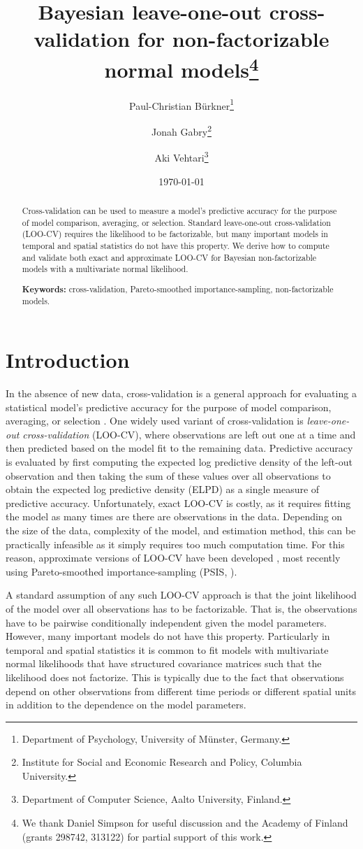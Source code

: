 \documentclass[11pt]{article}
\title{\bf Bayesian leave-one-out cross-validation for non-factorizable normal models\footnote{
We thank Daniel Simpson for useful discussion and the Academy of Finland
(grants 298742, 313122) for partial support of this work.
}\vspace{.1in}}
\author{Paul-Christian B\"{u}rkner\footnote{Department of Psychology, University of M\"{u}nster, Germany.}
  \and Jonah Gabry\footnote{Institute for Social and Economic Research and Policy, Columbia University.}
  \and Aki Vehtari\footnote{Department of Computer Science, Aalto University, Finland.
}\vspace{.1in}}
\date{\today \vspace{-.1in}}
\begin{document}
\sloppy
\maketitle
\thispagestyle{empty}

\begin{abstract}
Cross-validation can be used to measure a model's predictive accuracy for the
purpose  of model comparison, averaging, or selection. Standard leave-one-out
cross-validation  (LOO-CV) requires the likelihood to be factorizable, but many
important models in temporal  and spatial statistics do not have this property.
We derive how to compute and validate both exact and approximate LOO-CV for
Bayesian non-factorizable models with a multivariate normal likelihood.

\textbf{Keywords:} cross-validation, Pareto-smoothed importance-sampling,
  non-factorizable models.
\end{abstract}


\section{Introduction}

In the absence of new data, cross-validation is a general approach for evaluating
a statistical model's predictive accuracy for the purpose of model comparison, 
averaging, or selection \citep{geisser1979, hoeting1999, ando2010, vehtari2012}.
One widely used variant of
cross-validation is \emph{leave-one-out cross-validation} (LOO-CV), where
observations are left out one at a time and then predicted based on the model
fit to the remaining data. Predictive accuracy is evaluated by first computing
the expected log predictive density of the left-out observation and then taking
the sum of these values over all observations to obtain the expected log
predictive density (ELPD) as a single measure of predictive accuracy.
Unfortunately, exact LOO-CV is costly, as it requires fitting the model as many
times are there are observations in the data. Depending on the size of the data,
complexity of the model, and estimation method, this can be practically
infeasible as it simply requires too much computation time. 
For this reason, approximate versions of LOO-CV have been developed 
\citep{gelfand1992, vehtari2017loo}, most recently using 
Pareto-smoothed importance-sampling (PSIS, \cite{vehtari2017loo, vehtari2017psis}).

A standard assumption of any such LOO-CV approach is that the joint likelihood
of the model over all observations has to be factorizable. That is, the
observations have to be pairwise conditionally independent given the model
parameters. However, many important models do not have this property.
Particularly in temporal and spatial statistics it is common to
fit models with multivariate normal likelihoods that have structured covariance
matrices such that the likelihood does not factorize. This is typically due to the 
fact that observations depend on other observations from different time periods 
or different spatial units in addition to the dependence on the model parameters. 
\end{document}

